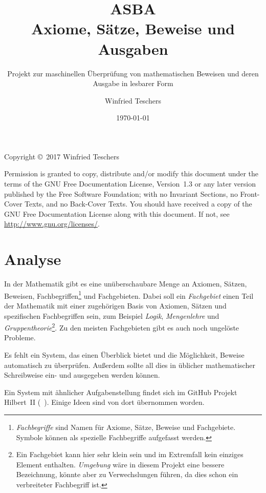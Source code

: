 \documentclass[english,ngerman,parskip=half,headsepline,footsepline]{scrreprt}
\title{{\Huge ASBA}\\Axiome, Sätze, Beweise und Ausgaben}
\subtitle{Projekt zur maschinellen Überprüfung von mathematischen Beweisen und deren Ausgabe in lesbarer Form}
\author{Winfried Teschers}
\date{\today}
\begin{document}
	\maketitle

	\tableofcontents
	\ihead{\textnormal{\textsf{\textbf{\contentsname}}}}
	\thispagestyle{scrheadings}

	\vfill
	Copyright \copyright\ 2017 Winfried Teschers

	\bigskip
	Permission is granted to copy, distribute and/or modify this document under the terms of the GNU Free Documentation License, Version~1.3 or any later version published by the Free Software Foundation; with no Invariant Sections, no Front-Cover Texts, and no Back-Cover Texts. You should have received a copy of the GNU Free Documentation License along with this document.  If not, see \url{http://www.gnu.org/licenses/}.

	\chapter{Analyse} %
	
	\ihead{\textnormal{\textsf{\textbf{\chaptername~\thesection}}}}
	\thispagestyle{scrheadings}

	In der Mathematik gibt es eine unüberschaubare Menge an Axiomen, Sätzen, Beweisen, Fachbegriffen\footnote{ \emph{Fachbegriffe} sind Namen für Axiome, Sätze, Beweise und Fachgebiete. Symbole können als spezielle Fachbegriffe aufgefasst werden.} und Fachgebieten. Dabei soll ein \emph{Fachgebiet} einen Teil der Mathematik  mit einer zugehörigen Basis von Axiomen, Sätzen und spezifischen Fachbegriffen sein, zum Beispiel \emph{Logik}, \emph{Mengenlehre} und \emph{Gruppentheorie}\footnote{ Ein Fachgebiet kann hier sehr klein sein und im Extremfall kein einziges Element enthalten. \emph{Umgebung} wäre in diesem Projekt eine bessere Bezeichnung, könnte aber zu Verwechslungen führen, da dies schon ein verbreiteter Fachbegriff ist.}. Zu den meisten Fachgebieten gibt es auch noch ungelöste Probleme.

	Es fehlt ein System, das einen Überblick bietet und die Möglichkeit, Beweise automatisch zu überprüfen. Außerdem sollte all dies in üblicher mathematischer Schreibweise ein- und ausgegeben werden können.

	Ein System mit ähnlicher Aufgabenstellung findet sich im GitHub Projekt Hilbert~II (\seename~\cite{bib:HilbertII, bib:qedeq}). Einige Ideen sind von dort übernommen worden.
\end{document}
